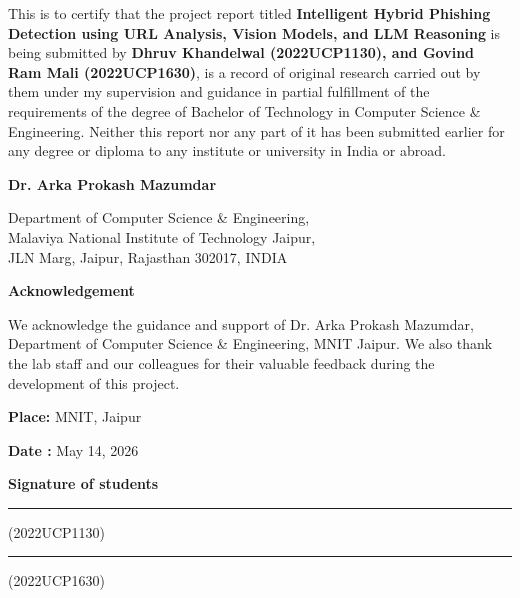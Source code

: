 \documentclass[12pt,a4paper]{report}
\begin{document}
\vspace{1cm}

\noindent
This is to certify that the project report titled 
\textbf{Intelligent Hybrid Phishing Detection using URL
Analysis, Vision Models, and LLM Reasoning} 
is being submitted by 
\textbf{Dhruv Khandelwal (2022UCP1130), and Govind Ram Mali (2022UCP1630)}, 
is a record of original research carried out by them under my supervision and guidance in partial fulfillment of the requirements of the degree of Bachelor of Technology in Computer Science \& Engineering. Neither this report nor any part of it has been submitted earlier for any degree or diploma to any institute or university in India or abroad.

\vspace{3cm}

\noindent\textbf{Dr. Arka Prokash Mazumdar}

\vspace{0.3cm}

\noindent
Department of Computer Science \& Engineering,\\
Malaviya National Institute of Technology Jaipur,\\
JLN Marg, Jaipur, Rajasthan 302017, INDIA


\newpage
\thispagestyle{fancy}

\begin{center}
    {\Huge\bfseries Acknowledgement}
\end{center}

\vspace{1.8cm}

\noindent
We acknowledge the guidance and support of Dr. Arka Prokash Mazumdar, Department of Computer Science \& Engineering, MNIT Jaipur. We also thank the lab staff and our colleagues for their valuable feedback during the development of this project.

\vspace{3.5cm}

\noindent
\begin{minipage}[t]{0.48\textwidth}
    \textbf{Place:} MNIT, Jaipur
    
    \textbf{Date :} May 14, 2026
\end{minipage}
\hfill
\begin{minipage}[t]{0.38\textwidth}
    \centering
    \textbf{Signature of students}
    
    \vspace{1.2cm}
    
    \rule{4cm}{0.4pt}(2022UCP1130)
    
    \vspace{1.2cm}
    
    \rule{4cm}{0.4pt}(2022UCP1630)
\end{minipage}
\end{document}
